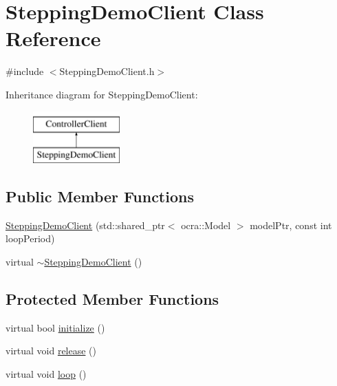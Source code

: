 \hypertarget{classSteppingDemoClient}{}\section{Stepping\+Demo\+Client Class Reference}
\label{classSteppingDemoClient}


{\ttfamily \#include $<$Stepping\+Demo\+Client.\+h$>$}

Inheritance diagram for Stepping\+Demo\+Client\+:\begin{figure}[H]
\begin{center}
\leavevmode
\includegraphics[height=2.000000cm]{classSteppingDemoClient}
\end{center}
\end{figure}
\subsection*{Public Member Functions}
\begin{DoxyCompactItemize}
\item 
\hyperlink{classSteppingDemoClient_a28e41547ba5641741ceb3b378a5983db}{Stepping\+Demo\+Client} (std\+::shared\+\_\+ptr$<$ ocra\+::\+Model $>$ model\+Ptr, const int loop\+Period)
\item 
virtual \hyperlink{classSteppingDemoClient_a573eed904c7262c5cdbaf6e254d72559}{$\sim$\+Stepping\+Demo\+Client} ()
\end{DoxyCompactItemize}
\subsection*{Protected Member Functions}
\begin{DoxyCompactItemize}
\item 
virtual bool \hyperlink{classSteppingDemoClient_a08dce195eece162eed175ac9487667c2}{initialize} ()
\item 
virtual void \hyperlink{classSteppingDemoClient_aafcb227c0d7ce24823957e2331caa88b}{release} ()
\item 
virtual void \hyperlink{classSteppingDemoClient_a37dba4764b5849cf33c395cd0d4b0eb5}{loop} ()
\end{DoxyCompactItemize}
